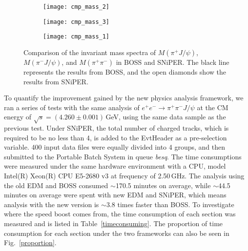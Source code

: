 \documentclass[a4paper,10pt,twoside]{cpc-hepnp}
\begin{document}
\begin{CJK*}{GB}{gbsn}
\begin{multicols}{2}
\end{multicols}
\begin{center}
\begin{figure}[htp]
  \centering
  \begin{subfigure}[htbp]{0.32\textwidth}
    \texttt{[image: cmp\_mass\_2]}
  \end{subfigure}
  \begin{subfigure}[htbp]{0.32\textwidth}
    \texttt{[image: cmp\_mass\_3]}
  \end{subfigure}
  \begin{subfigure}[htbp]{0.32\textwidth}
	   \texttt{[image: cmp\_mass\_1]}
  \end{subfigure}

  \caption{Comparison of the invariant mass spectra of $M(\pi^+J/\psi)$, $M(\pi^-J/\psi)$, and $M(\pi^+\pi^-)$ in BOSS and SNiPER. The black line represents the results from BOSS, and the open diamonds show the results from SNiPER.}
  \label{imass}
\end{figure}
\end{center}

\begin{multicols}{2}

To quantify the improvement gained by the new physics analysis framework, we ran a series of tests with the same analysis of $e^{+}e^{-} \rightarrow \pi^{+}\pi^{-}J/\psi$ at the CM energy of $\sqrt{s} = (4.260\pm0.001)$\,GeV, using the same data sample as the previous test.
Under SNiPER, the total number of charged tracks, which is required to be no less than 4, is added to the EvtHeader as a pre-selection variable.
400 input data files were equally divided into 4 groups, and then submitted to the Portable Batch System in queue \textit{besq}.
The time consumptions were measured under the same hardware environment with a CPU, model  Intel(R) Xeon(R) CPU E5-2680 v3 at frequency of 2.50\,GHz.
The analysis using the old EDM and BOSS consumed $\sim$170.5 minutes on average, while $\sim$44.5 minutes on average were spent with new EDM and SNiPER, which means analysis with the new version is $\sim$3.8 times faster than BOSS.
To investigate where the speed boost comes from, the time consumption of each section was measured and is listed in Table~\ref{timeconsuming}.
The proportion of time consumption for each section under the two frameworks can also be seen in Fig.~\ref{proportion}.


\end{multicols}
\end{CJK*}
\end{document}
